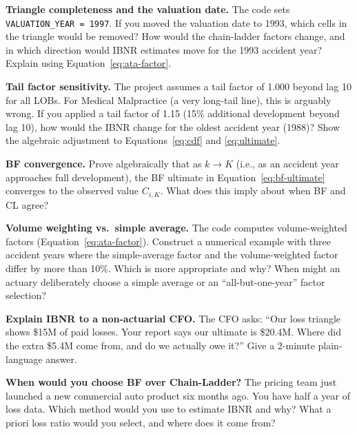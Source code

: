 \begin{challengebox}
\textbf{Triangle completeness and the valuation date.}
The code sets \texttt{VALUATION\_YEAR = 1997}.  If you moved the valuation
date to 1993, which cells in the triangle would be removed?  How would the
chain-ladder factors change, and in which direction would IBNR estimates
move for the 1993 accident year?  Explain using Equation~\eqref{eq:ata-factor}.
\end{challengebox}

\begin{challengebox}
\textbf{Tail factor sensitivity.}
The project assumes a tail factor of 1.000 beyond lag 10 for all LOBs.
For Medical Malpractice (a very long-tail line), this is arguably wrong.
If you applied a tail factor of 1.15 (15\% additional development beyond lag 10),
how would the IBNR change for the oldest accident year (1988)?  Show the
algebraic adjustment to Equations~\eqref{eq:cdf} and \eqref{eq:ultimate}.
\end{challengebox}

\begin{challengebox}
\textbf{BF convergence.}
Prove algebraically that as $k \to K$ (i.e., as an accident year approaches
full development), the BF ultimate in Equation~\eqref{eq:bf-ultimate}
converges to the observed value $C_{i,K}$.  What does this imply about when
BF and CL agree?
\end{challengebox}

\begin{challengebox}
\textbf{Volume weighting vs.\ simple average.}
The code computes volume-weighted factors (Equation~\eqref{eq:ata-factor}).
Construct a numerical example with three accident years where the simple-average
factor and the volume-weighted factor differ by more than 10\%.  Which is
more appropriate and why?  When might an actuary deliberately choose a simple
average or an ``all-but-one-year'' factor selection?
\end{challengebox}

\begin{interviewbox}
\textbf{Explain IBNR to a non-actuarial CFO.}
The CFO asks: ``Our loss triangle shows \$15M of paid losses.  Your report
says our ultimate is \$20.4M.  Where did the extra \$5.4M come from, and
do we actually owe it?''  Give a 2-minute plain-language answer.
\end{interviewbox}

\begin{interviewbox}
\textbf{When would you choose BF over Chain-Ladder?}
The pricing team just launched a new commercial auto product six months ago.
You have half a year of loss data.  Which method would you use to estimate
IBNR and why?  What a priori loss ratio would you select, and where does
it come from?
\end{interviewbox}

